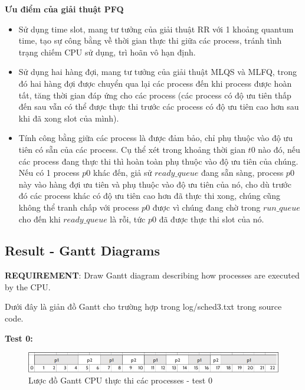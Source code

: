 \vspace{0.5cm}

\textbf{Ưu điểm của giải thuật PFQ}

\vspace{0.5cm}

\begin{itemize}
	\item Sử dụng time slot, mang tư tưởng của giải thuật RR với 1 khoảng quantum time, tạo sự công bằng về thời gian thực thi giữa các process, tránh tình trạng chiếm CPU sử dụng, trì hoãn vô hạn định.
	\item Sử dụng hai hàng đợi, mang tư tưởng của giải thuật MLQS và MLFQ, trong đó hai hàng đợi được chuyển qua lại các process đến khi process được hoàn tất, tăng thời gian đáp ứng cho các process (các process có độ ưu tiên thấp đến sau vẫn có thể được thực thi trước các process có độ ưu tiên cao hơn sau khi đã xong slot của mình).
	\item Tính công bằng giữa các process là được đảm bảo, chỉ phụ thuộc vào độ ưu tiên có sẵn của các process. Cụ thể xét trong khoảng thời gian $ t0 $ nào đó, nếu các process đang thực thi thì hoàn toàn phụ thuộc vào độ ưu tiên của chúng. Nếu có 1 process $ p0 $ khác đến, giả sử $ ready\_queue $ đang sẵn sàng, process $ p0 $ này vào hàng đợi ưu tiên và phụ thuộc vào độ ưu tiên của nó, cho dù trước đó các process khác có độ ưu tiên cao hơn đã thực thi xong, chúng cũng không thể tranh chấp với process $ p0 $ được vì chúng đang chờ trong  $ run\_queue $ cho đến khi $ ready\_queue $ là rỗi, tức $ p0 $ đã được thực thi slot của nó.
\end{itemize}

\vspace{0.5cm}

\subsection{Result - Gantt Diagrams}
\vspace{0.5cm}
\textbf{REQUIREMENT}: Draw Gantt diagram describing how processes are executed by the CPU.

\vspace{0.5cm}

Dưới đây là giản đồ Gantt cho trường hợp trong log/sched3.txt trong source code.

\textbf{Test 0:}

\vspace{0.5cm}

\begin{figure}[tph]
	\centering
	\includegraphics[width=13cm]{Images/sched0.png}
	\vspace{0.5cm}
	\caption{Lược đồ Gantt CPU thực thi các processes - test 0}
	\label{fig:schedtest0}
\end{figure}


